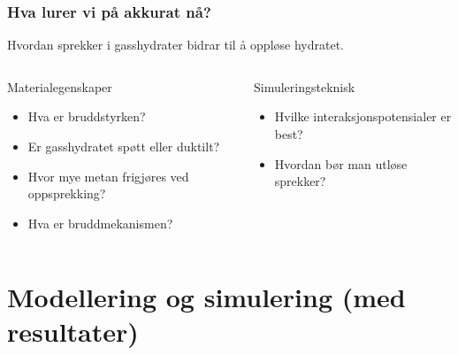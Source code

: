 \documentclass[utf8x, notes, graphics]{beamer}
\begin{document}
\begin{frame}
\frametitle{Hva lurer vi på akkurat nå?}
Hvordan sprekker i gasshydrater bidrar til å oppløse hydratet.
\begin{columns}[T]
\begin{block}{Materialegenskaper}
\begin{itemize}
\item Hva er bruddstyrken?
\item Er gasshydratet spøtt eller duktilt?
\item Hvor mye metan frigjøres ved oppsprekking?
\item Hva er bruddmekanismen?
\end{itemize}
\end{block}
\begin{block}{Simuleringsteknisk}
\begin{itemize}
\item Hvilke interaksjonspotensialer er best?
\item Hvordan bør man utløse sprekker?
\end{itemize}
\end{block}
\end{columns}
\end{frame}

\section{Modellering og simulering (med resultater)}
\end{document}
